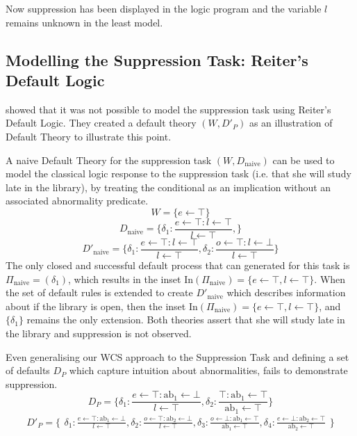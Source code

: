 Now suppression has been displayed in the logic program and the variable $l$ remains unknown in the least model.

\subsection{Modelling the Suppression Task: Reiter's Default Logic} \label{ssec:supReit}
\cite{ragni2017formal} showed that it was not possible to model the suppression task using Reiter's Default Logic. They created a default theory $(W, D'_P)$ as an illustration of Default Theory to illustrate this point.

A naive Default Theory for the suppression task $(W,D_\text{naive})$ can be used to model the classical logic response to the suppression task (i.e. that she will study late in the library), by treating the conditional as an implication without an associated abnormality predicate.
\[
W=\{e\leftarrow \top\}
\]
\[
D_\text{naive}=\{\delta_1:\frac{e\leftarrow \top:l \leftarrow \top}{l\leftarrow\top} ,
\}
\]
\[
D'_\text{naive}=\{\delta_1:\frac{e\leftarrow \top:l \leftarrow \top}{l\leftarrow\top} ,
\delta_2:\frac{o\leftarrow \top:l \leftarrow \bot}{l\leftarrow\top}
\}
\]
The only closed and successful default process that can generated for this task is $\Pi_\text{naive}=(\delta_1)$, which results in the inset $\text{In}(\Pi_\text{naive})=\{e\leftarrow \top, l\leftarrow\top\}$. When the set of default rules is extended to create $D'_\text{naive}$ which describes information about if the library is open, then the inset $\text{In}(\Pi_\text{naive})=\{e\leftarrow \top, l\leftarrow\top\}$, and $\{\delta_1\}$ remains the only extension. Both theories assert that she will study late in the library and suppression is not observed.

Even generalising our WCS approach to the Suppression Task and defining a set of defaults $D_P$ which capture intuition about abnormalities, fails to demonstrate suppression.
\[
D_P=\{\delta_1:\frac{e\leftarrow \top:\text{ab}_1 \leftarrow \bot}{l\leftarrow\top} ,
\delta_2:\frac{\top:\text{ab}_1 \leftarrow \top}{\text{ab}_1\leftarrow\top}
\}
\]
\[
D'_P=\{\begin{matrix}\delta_1:\frac{e\leftarrow \top:\text{ab}_1 \leftarrow \bot}{l\leftarrow\top} ,
\delta_2:\frac{o\leftarrow \top:\text{ab}_2 \leftarrow \bot}{l\leftarrow\top},
\delta_3:\frac{o\leftarrow \bot:\text{ab}_1 \leftarrow \top}{\text{ab}_1\leftarrow\top},
\delta_4:\frac{e\leftarrow \bot:\text{ab}_2 \leftarrow \top}{\text{ab}_2\leftarrow\top}
\end{matrix}\}
\]

